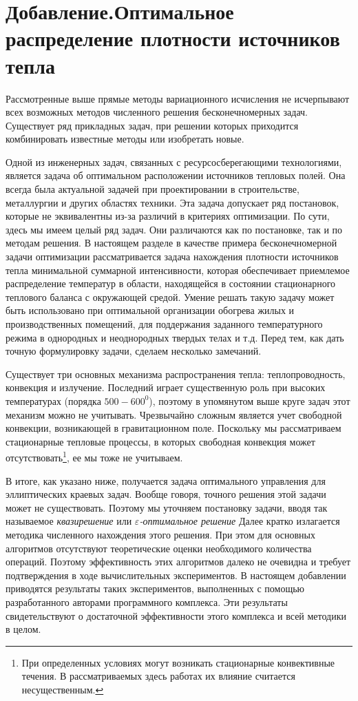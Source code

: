 \section*{ \sloppy \center Добавление.Оптимальное распределение плотности источников тепла }
\sloppy
\emergencystretch=20pt


 Рассмотренные выше прямые методы вариационного исчисления не исчерпывают всех возможных методов численного решения бесконечномерных задач.
Существует ряд прикладных задач, при решении которых приходится комбинировать известные методы или изобретать новые.

Одной из инженерных задач, связанных с ресурсосберегающими технологиями, является задача об оптимальном расположении источников тепловых полей. Она всегда была актуальной задачей при проектировании в строительстве, металлургии и других областях техники. Эта задача допускает ряд постановок, которые не эквивалентны из-за различий в критериях оптимизации. По сути, здесь мы имеем целый ряд задач. Они различаются как по постановке, так и по методам решения. В настоящем разделе в качестве примера бесконечномерной задачи оптимизации рассматривается задача нахождения плотности источников тепла минимальной суммарной интенсивности, которая обеспечивает приемлемое распределение температур в области, находящейся в состоянии стационарного теплового баланса с окружающей средой. Умение решать такую задачу может быть использовано при оптимальной организации обогрева жилых и производственных помещений, для поддержания заданного температурного режима в однородных и неоднородных твердых телах и т.д. Перед тем, как дать точную формулировку задачи, сделаем несколько замечаний.

Существует три основных механизма распространения тепла: теплопроводность, конвекция и излучение. Последний играет существенную роль при высоких температурах (порядка $500-600^0 $), поэтому в упомянутом выше круге задач этот механизм можно не учитывать. Чрезвычайно сложным является учет свободной конвекции, возникающей в гравитационном поле. Поскольку мы рассматриваем стационарные тепловые процессы, в которых свободная конвекция может
 отсутствовать\footnote{  При определенных условиях могут возникать стационарные конвективные течения. В рассматриваемых здесь работах их влияние считается несущественным.}, ее мы тоже не учитываем.

В итоге, как указано ниже, получается задача оптимального управления для эллиптических краевых задач. Вообще говоря, точного решения этой задачи может не существовать. Поэтому мы уточняем постановку задачи, вводя так называемое \textit{квазирешение} или
 \textit{$\varepsilon$-оптимальное решение}
Далее кратко излагается методика численного нахождения этого решения. При этом для основных алгоритмов отсутствуют теоретические оценки необходимого количества операций. Поэтому эффективность этих алгоритмов далеко не очевидна и требует подтверждения в ходе вычислительных экспериментов. В настоящем добавлении приводятся результаты таких экспериментов, выполненных с помощью разработанного авторами программного комплекса. Эти результаты свидетельствуют о достаточной эффективности этого комплекса и всей методики в целом.
